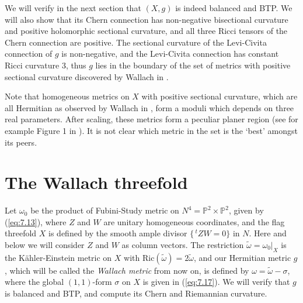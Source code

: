 \documentclass{amsart}
\numberwithin{equation}{section}
\theoremstyle{definition}
\renewcommand{\1}{\mathds{1}}
\renewcommand{\>}{\rightarrow}
\begin{document}
We will verify in the next section that $(X,g)$ is indeed balanced and BTP.  We will also show that its Chern connection has non-negative bisectional curvature and positive holomorphic sectional curvature, and all three Ricci tensors of the Chern connection are positive. The sectional curvature of the Levi-Civita connection of $g$ is non-negative, and the Levi-Civita connection has constant Ricci curvature $3$, thus $g$ lies in the boundary of the set of metrics with positive sectional curvature discovered by Wallach in \cite{Wallach}.

Note that homogeneous metrics on $X$ with positive sectional curvature, which are all Hermitian as observed by Wallach in \cite{Wallach}, form a moduli which depends on three real parameters. After scaling, these metrics form a peculiar planer region (see for example Figure 1 in \cite{BM}). It is not clear which metric in the set is the `best' amongst its peers.


\vspace{0.4cm}

\section{The Wallach threefold}\label{WCH3D}
Let $\omega_0$ be the product of Fubini-Study metric on $N^4={\mathbb P}^2\times {\mathbb P}^2$, given by (\ref{eq:7.13}), where $Z$ and $W$ are unitary homogeneous coordinates, and the flag threefold $X$ is defined by the smooth ample divisor $\{ \,^t\!ZW=0\}$ in $N$. Here and below we will consider $Z$ and $W$ as column vectors. The restriction $\tilde{\omega }= \omega_0|_X$ is the K\"ahler-Einstein metric on $X$ with $\mbox{Ric}(\tilde{\omega})=2\tilde{\omega}$, and our Hermitian metric $g$, which will be called the {\em Wallach metric} from now on, is defined by $\omega = \tilde{\omega} - \sigma $, where the global $(1,1)$-form $\sigma$ on $X$ is given in (\ref{eq:7.17}). We will verify that $g$ is balanced and BTP, and compute its Chern and Riemannian curvature.
\end{document}

